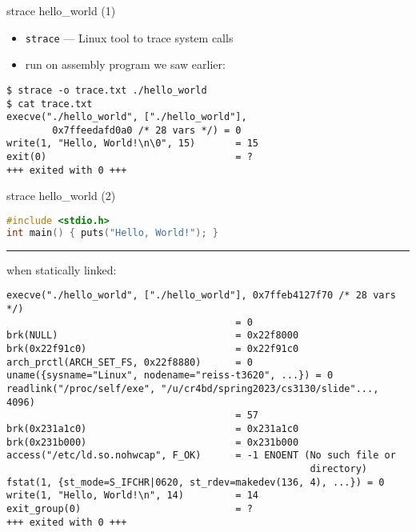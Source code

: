 \begin{frame}[fragile]{strace hello\_world (1)}
\begin{itemize}
\item \texttt{strace} --- Linux tool to trace system calls
\item run on assembly program we saw earlier:
\end{itemize}
\begin{Verbatim}[fontsize=\small]
$ strace -o trace.txt ./hello_world
$ cat trace.txt
execve("./hello_world", ["./hello_world"],
        0x7ffeedafd0a0 /* 28 vars */) = 0
write(1, "Hello, World!\n\0", 15)       = 15
exit(0)                                 = ?
+++ exited with 0 +++
\end{Verbatim}
\end{frame}

\begin{frame}[fragile]{strace hello\_world (2)}
\begin{lstlisting}[language=C]
#include <stdio.h>
int main() { puts("Hello, World!"); }
\end{lstlisting}
\hrule
when statically linked:
\begin{Verbatim}[fontsize=\fontsize{10}{11}\selectfont]
execve("./hello_world", ["./hello_world"], 0x7ffeb4127f70 /* 28 vars */)
                                        = 0
brk(NULL)                               = 0x22f8000
brk(0x22f91c0)                          = 0x22f91c0
arch_prctl(ARCH_SET_FS, 0x22f8880)      = 0
uname({sysname="Linux", nodename="reiss-t3620", ...}) = 0
readlink("/proc/self/exe", "/u/cr4bd/spring2023/cs3130/slide"..., 4096)
                                        = 57
brk(0x231a1c0)                          = 0x231a1c0
brk(0x231b000)                          = 0x231b000
access("/etc/ld.so.nohwcap", F_OK)      = -1 ENOENT (No such file or
                                                     directory)
fstat(1, {st_mode=S_IFCHR|0620, st_rdev=makedev(136, 4), ...}) = 0
write(1, "Hello, World!\n", 14)         = 14
exit_group(0)                           = ?
+++ exited with 0 +++
\end{Verbatim}
\end{frame}

